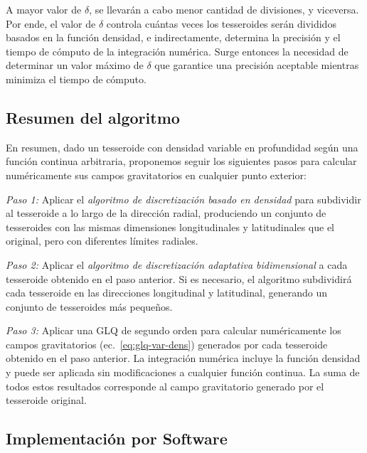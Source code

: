 A mayor valor de $\delta$, se llevarán a cabo menor cantidad de divisiones,
y viceversa.
Por ende, el valor de $\delta$ controla cuántas veces los tesseroides serán
divididos basados en la función densidad, e indirectamente, determina la
precisión y el tiempo de cómputo de la integración numérica.
Surge entonces la necesidad de determinar un valor máximo de $\delta$ que
garantice una precisión aceptable mientras minimiza el tiempo de cómputo.


\subsection{Resumen del algoritmo}

En resumen, dado un tesseroide con densidad variable en profundidad según una
función continua arbitraria, proponemos seguir los siguientes pasos para
calcular numéricamente sus campos gravitatorios en cualquier punto exterior:

\textit{Paso 1:}
Aplicar el \emph{algoritmo de discretización basado en densidad} para
subdividir al tesseroide a lo largo de la dirección radial, produciendo un
conjunto de tesseroides con las mismas dimensiones longitudinales
y latitudinales que el original, pero con diferentes límites radiales.

\textit{Paso 2:}
Aplicar el \emph{algoritmo de discretización adaptativa bidimensional} a cada
tesseroide obtenido en el paso anterior.
Si es necesario, el algoritmo subdividirá cada tesseroide en las direcciones
longitudinal y latitudinal, generando un conjunto de tesseroides más pequeños.

\textit{Paso 3:}
Aplicar una \ac{GLQ} de segundo orden para calcular numéricamente los campos
gravitatorios (ec.~\ref{eq:glq-var-dens}) generados por cada tesseroide
obtenido en el paso anterior. La integración numérica incluye la función
densidad y puede ser aplicada sin modificaciones a cualquier función continua.
La suma de todos estos resultados corresponde al campo gravitatorio generado
por el tesseroide original.


\subsection{Implementación por Software}

